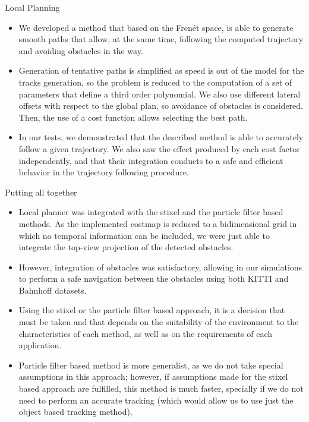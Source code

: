 \begin{frame}{Local Planning}
  \small
  \begin{itemize}
    \item We developed a method that based on the Frenét space, is able to generate smooth paths that allow, at the same time, following the computed trajectory and avoiding obstacles in the way. 
    \item Generation of tentative paths is simplified as speed is out of the model for the tracks generation, so the problem is reduced to the computation of a set of parameters that define a third order polynomial. We also use different lateral offsets with respect to the global plan, so avoidance of obstacles is considered. Then, the use of a cost function allows selecting the best path.
    \item In our tests, we demonstrated that the described method is able to accurately follow a given trajectory. We also saw the effect produced by each cost factor independently, and that their integration conducts to a safe and efficient behavior in the trajectory following procedure.
  \end{itemize}
\end{frame}

\begin{frame}{Putting all together}
  \footnotesize
  \begin{itemize}
    \item Local planner was integrated with the stixel and the particle filter based methods. As the implemented costmap is reduced to a bidimensional grid in which no temporal information can be included, we were just able to integrate the top-view projection of the detected obstacles.
    \item However, integration of obstacles was satisfactory, allowing in our simulations to perform a safe navigation between the obstacles using both KITTI \citep{geiger2013vision} and Bahnhoff \citep{ess2009robust} datasets. 
    \item Using the stixel or the particle filter based approach, it is a decision that must be taken and that depends on the suitability of the environment to the characteristics of each method, as well as on the requirements of each application. \item Particle filter based method is more generalist, as we do not take special assumptions in this approach; however, if assumptions made for the stixel based approach are fulfilled, this method is much faster, specially if we do not need to perform an accurate tracking (which would allow us to use just the object based tracking method).
  \end{itemize}
\end{frame}

